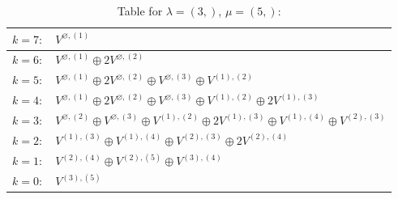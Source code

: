 \documentclass[a4paper,12pt]{article}
\begin{document}
\renewcommand{\arraystretch}{1.6} 
\begin{table}[H]
\centering
\caption{Table for $\lambda = (3,)$, $\mu = (5,)$:}
\begin{tabular}{|>{\centering\arraybackslash}p{15cm}|}
\hline
 $k = 7: \quad V^{\varnothing, (1)} $ \\ \hline
 $k = 6: \quad V^{\varnothing, (1)} \oplus 2 V^{\varnothing, (2)} $ \\ \hline
 $k = 5: \quad V^{\varnothing, (1)} \oplus 2 V^{\varnothing, (2)} \oplus V^{\varnothing, (3)} \oplus V^{(1), (2)} $ \\ \hline
 $k = 4: \quad V^{\varnothing, (1)} \oplus 2 V^{\varnothing, (2)} \oplus V^{\varnothing, (3)} \oplus V^{(1), (2)} \oplus 2 V^{(1), (3)} $ \\ \hline
 $k = 3: \quad V^{\varnothing, (2)} \oplus V^{\varnothing, (3)} \oplus V^{(1), (2)} \oplus 2 V^{(1), (3)} \oplus V^{(1), (4)} \oplus V^{(2), (3)} $ \\ \hline
 $k = 2: \quad V^{(1), (3)} \oplus V^{(1), (4)} \oplus V^{(2), (3)} \oplus 2 V^{(2), (4)} $ \\ \hline
 $k = 1: \quad V^{(2), (4)} \oplus V^{(2), (5)} \oplus V^{(3), (4)} $ \\ \hline
 $k = 0: \quad V^{(3), (5)} $ \\ \hline
\end{tabular}
\end{table}
\end{document}
